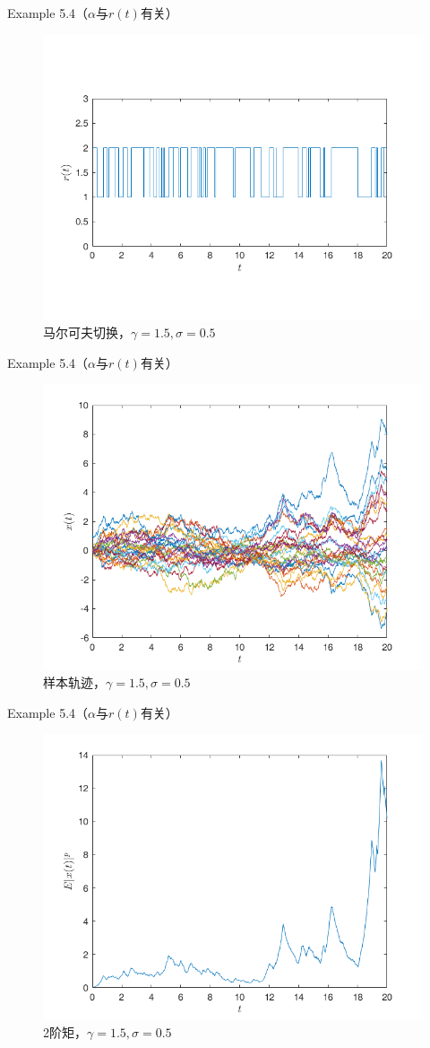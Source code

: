 \documentclass[10pt,aspectratio=43]{beamer}
\begin{document}
\begin{frame}{Example 5.4（$ \alpha $与$ r(t) $有关）
}
\begin{figure}
\centering
\includegraphics[width=0.7\linewidth]{../figures/8}
\caption{马尔可夫切换，$ \gamma=1.5,\sigma=0.5 $}
\end{figure}
\end{frame}

\begin{frame}{Example 5.4（$ \alpha $与$ r(t) $有关）
}
\begin{figure}
\centering
\includegraphics[width=0.7\linewidth]{../figures/9}
\caption{样本轨迹，$ \gamma=1.5,\sigma=0.5 $}
\end{figure}
\end{frame}

\begin{frame}{Example 5.4（$ \alpha $与$ r(t) $有关）
}
\begin{figure}
\centering
\includegraphics[width=0.7\linewidth]{../figures/10}
\caption{2阶矩，$ \gamma=1.5,\sigma=0.5 $}
\end{figure}
\end{frame}
\end{document}
